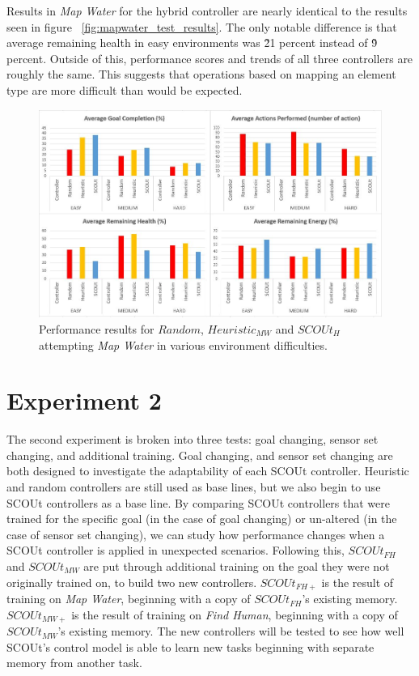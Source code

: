 Results in \textit{Map Water} for the hybrid controller are nearly identical to the results seen in figure ~\ref{fig:mapwater_test_results}.
The only notable difference is that average remaining health in easy environments was \~21 percent instead of \~9 percent.
Outside of this, performance scores and trends of all three controllers are roughly the same.
This suggests that operations based on mapping an element type are more difficult than would be expected.

\begin{figure}[H]
  \includegraphics[width=1.0\columnwidth]{Figures/Results/Experiment1/HybridMapWater.JPG}
  \caption{Performance results for $Random$, $Heuristic_{MW}$ and $SCOUt_{H}$ attempting \textit{Map Water} in various environment difficulties.}
  \label{fig:hybrid_mapwater_test_results}
\end{figure}


\section{Experiment 2} \label{sec:experiment2}
The second experiment is broken into three tests: goal changing, sensor set changing, and additional training.
Goal changing, and sensor set changing are both designed to investigate the adaptability of each SCOUt controller.
Heuristic and random controllers are still used as base lines, but we also begin to use SCOUt controllers as a base line.
By comparing SCOUt controllers that were trained for the specific goal (in the case of goal changing) or un-altered (in the case of sensor set changing), we can study how performance changes when a SCOUt controller is applied in unexpected scenarios.
Following this, $SCOUt_{FH}$ and $SCOUt_{MW}$ are put through additional training on the goal they were not originally trained on, to build two new controllers.
$SCOUt_{FH+}$ is the result of training on \textit{Map Water}, beginning with a copy of $SCOUt_{FH}$'s existing memory.
$SCOUt_{MW+}$ is the result of training on \textit{Find Human}, beginning with a copy of $SCOUt_{MW}$'s existing memory.
The new controllers will be tested to see how well SCOUt's control model is able to learn new tasks beginning with separate memory from another task.


